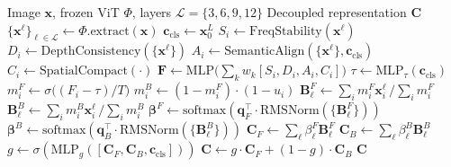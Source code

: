 \documentclass{article}
\begin{document}
\begin{algorithm}[t]
\caption{DAFB-CLS Forward Pass}
\label{alg:dafb}
\begin{algorithmic}[1]
\Require Image $\mathbf{x}$, frozen ViT $\Phi$, layers $\mathcal{L}=\{3,6,9,12\}$
\Ensure Decoupled representation $\mathbf{C}$
\State $\{\mathbf{x}^{\ell}\}_{\ell\in\mathcal{L}} \gets \Phi.\text{extract}(\mathbf{x})$
\State $\mathbf{c}_{\text{cls}} \gets \mathbf{x}_{0}^{L}$
\State $S_i \gets \text{FreqStability}(\mathbf{x}^{\ell})$
\State $D_i \gets \text{DepthConsistency}(\{\mathbf{x}^{\ell}\})$
\State $A_i \gets \text{SemanticAlign}(\{\mathbf{x}^{\ell}\},\mathbf{c}_{\text{cls}})$
\State $C_i \gets \text{SpatialCompact}(\cdot)$
\State $\mathbf{F} \gets \text{MLP}\bigl(\sum_k w_k [S_i,D_i,A_i,C_i]\bigr)$
\State $\tau \gets \text{MLP}_{\tau}(\mathbf{c}_{\text{cls}})$
\State $m_i^F \gets \sigma\bigl((F_i-\tau)/T\bigr)$
\State $m_i^B \gets (1-m_i^F)\cdot(1-u_i)$
    \State $\mathbf{B}_{\ell}^{F} \gets \sum_i m_i^F\mathbf{x}_i^{\ell}\,/\!\sum_i m_i^F$
    \State $\mathbf{B}_{\ell}^{B} \gets \sum_i m_i^B\mathbf{x}_i^{\ell}\,/\!\sum_i m_i^B$
\EndFor
\State $\boldsymbol{\beta}^{F} \gets \text{softmax}(\mathbf{q}_F^{\top}\!\cdot\!\text{RMSNorm}(\{\mathbf{B}_{\ell}^{F}\}))$
\State $\boldsymbol{\beta}^{B} \gets \text{softmax}(\mathbf{q}_B^{\top}\!\cdot\!\text{RMSNorm}(\{\mathbf{B}_{\ell}^{B}\}))$
\State $\mathbf{C}_F \gets \sum_{\ell}\beta_{\ell}^{F}\mathbf{B}_{\ell}^{F}$
\State $\mathbf{C}_B \gets \sum_{\ell}\beta_{\ell}^{B}\mathbf{B}_{\ell}^{B}$
\State $g \gets \sigma(\text{MLP}_g([\mathbf{C}_F,\mathbf{C}_B,\mathbf{c}_{\text{cls}}]))$
\State $\mathbf{C} \gets g\cdot\mathbf{C}_F + (1-g)\cdot\mathbf{C}_B$
\State \Return $\mathbf{C}$
\end{algorithmic}
\end{algorithm}
\end{document}
